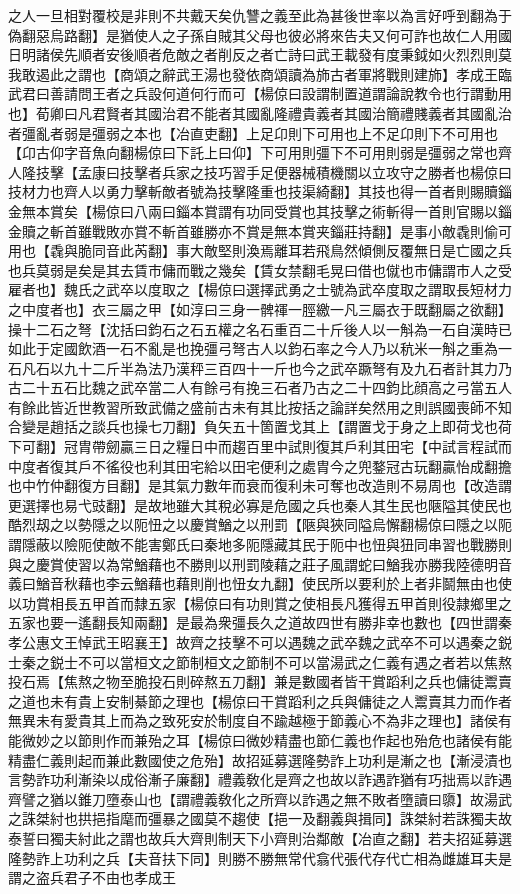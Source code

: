 之人一旦相對覆校是非則不共戴天矣仇讐之義至此為甚後世率以為言好呼到翻為于偽翻惡烏路翻】是猶使人之子孫自賊其父母也彼必將來告夫又何可詐也故仁人用國日明諸侯先順者安後順者危敵之者削反之者亡詩曰武王載發有度秉鉞如火烈烈則莫我敢遏此之謂也【商頌之辭武王湯也發依商頌讀為斾古者軍將戰則建斾】孝成王臨武君曰善請問王者之兵設何道何行而可【楊倞曰設謂制置道謂論說教令也行謂動用也】荀卿曰凡君賢者其國治君不能者其國亂隆禮貴義者其國治簡禮賤義者其國亂治者彊亂者弱是彊弱之本也【冶直吏翻】上足卬則下可用也上不足卬則下不可用也【卬古仰字音魚向翻楊倞曰下託上曰仰】下可用則彊下不可用則弱是彊弱之常也齊人隆技擊【孟康曰技擊者兵家之技巧習手足便器械積機關以立攻守之勝者也楊倞曰技材力也齊人以勇力擊斬敵者號為技擊隆重也技渠綺翻】其技也得一首者則賜贖錙金無本賞矣【楊倞曰八兩曰錙本賞謂有功同受賞也其技擊之術斬得一首則官賜以錙金贖之斬首雖戰敗亦賞不斬首雖勝亦不賞是無本賞夹錙莊持翻】是事小敵毳則偷可用也【毳與脆同音此芮翻】事大敵堅則渙焉離耳若飛鳥然傾側反覆無日是亡國之兵也兵莫弱是矣是其去賃市傭而戰之幾矣【賃女禁翻毛晃曰借也僦也市傭謂市人之受雇者也】魏氏之武卒以度取之【楊倞曰選擇武勇之士號為武卒度取之謂取長短材力之中度者也】衣三屬之甲【如淳曰三身一髀禈一脛繳一凡三屬衣于既翻屬之欲翻】操十二石之弩【沈括曰鈞石之石五權之名石重百二十斤後人以一斛為一石自漢時已如此于定國飲酒一石不亂是也挽彊弓弩古人以鈞石率之今人乃以秔米一斛之重為一石凡石以九十二斤半為法乃漢秤三百四十一斤也今之武卒蹶弩有及九石者計其力乃古二十五石比魏之武卒當二人有餘弓有挽三石者乃古之二十四鈞比顔高之弓當五人有餘此皆近世教習所致武備之盛前古未有其比按括之論詳矣然用之則誤國喪師不知合變是趙括之談兵也操七刀翻】負矢五十箇置戈其上【謂置戈于身之上即荷戈也荷下可翻】冠胄帶劒贏三日之糧日中而趨百里中試則復其戶利其田宅【中試言程試而中度者復其戶不徭役也利其田宅給以田宅便利之處胄今之兜鍪冠古玩翻贏怡成翻擔也中竹仲翻復方目翻】是其氣力數年而衰而復利未可奪也改造則不易周也【改造謂更選擇也易弋豉翻】是故地雖大其稅必寡是危國之兵也秦人其生民也陿隘其使民也酷烈刼之以勢隱之以阨忸之以慶賞鰌之以刑罰【陿與狹同隘烏懈翻楊倞曰隱之以阨謂隱蔽以險阨使敵不能害鄭氏曰秦地多阨隱藏其民于阨中也忸與狃同串習也戰勝則與之慶賞使習以為常鰌藉也不勝則以刑罰陵藉之莊子風謂蛇曰鰌我亦勝我陸德明音義曰鰌音秋藉也李云鰌藉也藉則削也忸女九翻】使民所以要利於上者非鬬無由也使以功賞相長五甲首而隸五家【楊倞曰有功則賞之使相長凡獲得五甲首則役隷鄉里之五家也要一遙翻長知兩翻】是最為衆彊長久之道故四世有勝非幸也數也【四世謂秦孝公惠文王悼武王昭襄王】故齊之技擊不可以遇魏之武卒魏之武卒不可以遇秦之鋭士秦之鋭士不可以當桓文之節制桓文之節制不可以當湯武之仁義有遇之者若以焦熬投石焉【焦熬之物至脆投石則碎熬五刀翻】兼是數國者皆干賞蹈利之兵也傭徒鬻賣之道也未有貴上安制綦節之理也【楊倞曰干賞蹈利之兵與傭徒之人鬻賣其力而作者無異未有愛貴其上而為之致死安於制度自不踰越極于節義心不為非之理也】諸侯有能微妙之以節則作而兼殆之耳【楊倞曰微妙精盡也節仁義也作起也殆危也諸侯有能精盡仁義則起而兼此數國使之危殆】故招延募選隆勢詐上功利是漸之也【漸浸漬也言勢詐功利漸染以成俗漸子廉翻】禮義敎化是齊之也故以詐遇詐猶有巧拙焉以詐遇齊譬之猶以錐刀墮泰山也【謂禮義敎化之所齊以詐遇之無不敗者墮讀曰隳】故湯武之誅桀紂也拱挹指麾而彊暴之國莫不趨使【挹一及翻義與揖同】誅桀紂若誅獨夫故泰誓曰獨夫紂此之謂也故兵大齊則制天下小齊則治鄰敵【冶直之翻】若夫招延募選隆勢詐上功利之兵【夫音扶下同】則勝不勝無常代翕代張代存代亡相為雌雄耳夫是謂之盗兵君子不由也孝成王